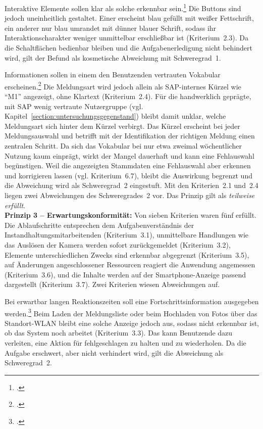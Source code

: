 Interaktive Elemente sollen klar als solche erkennbar
sein.\footcite[Vgl.][Abschnitt~5.2.2.4]{DIN_ISO_9241-110:2020}
Die Buttons sind jedoch uneinheitlich gestaltet.
Einer erscheint blau gefüllt mit weißer Fettschrift, ein anderer nur blau
umrandet mit dünner blauer Schrift, sodass ihr Interaktionscharakter weniger
unmittelbar erschließbar ist (Kriterium~2.3).
Da die Schaltflächen bedienbar bleiben und die Aufgabenerledigung nicht behindert
wird, gilt der Befund als kosmetische Abweichung mit Schweregrad~1.

Informationen sollen in einem den Benutzenden vertrauten Vokabular
erscheinen.\footcite[Vgl.][Abschnitt~5.2.2.5]{DIN_ISO_9241-110:2020}
Die Meldungsart wird jedoch allein als SAP-internes Kürzel wie \enquote{M1}
angezeigt, ohne Klartext (Kriterium~2.4).
Für die handwerklich geprägte, mit SAP wenig vertraute Nutzergruppe
(vgl. Kapitel~\ref{section:untersuchungsgegenstand}) bleibt damit unklar, welche
Meldungsart sich hinter dem Kürzel verbirgt.
Das Kürzel erscheint bei jeder Meldungsauswahl und betrifft mit der
Identifikation der richtigen Meldung einen zentralen Schritt.
Da sich das Vokabular bei nur etwa zweimal wöchentlicher Nutzung kaum einprägt,
wirkt der Mangel dauerhaft und kann eine Fehlauswahl begünstigen.
Weil die angezeigten Stammdaten eine Fehlauswahl aber erkennen und korrigieren
lassen (vgl. Kriterium~6.7), bleibt die Auswirkung begrenzt und die Abweichung
wird als Schweregrad~2 eingestuft.
Mit den Kriterien~2.1 und~2.4 liegen zwei Abweichungen des Schweregrades~2 vor.
Das Prinzip gilt als \emph{teilweise erfüllt}.\\
\textbf{Prinzip 3 -- Erwartungskonformität:}
Von sieben Kriterien waren fünf erfüllt.
Die Ablaufschritte entsprechen dem Aufgabenverständnis der
Instandhaltungsmitarbeitenden (Kriterium~3.1), unmittelbare Handlungen wie das
Auslösen der Kamera werden sofort zurückgemeldet (Kriterium~3.2), Elemente
unterschiedlichen Zwecks sind erkennbar abgegrenzt (Kriterium~3.5), auf
Änderungen angeschlossener Ressourcen reagiert die Anwendung angemessen
(Kriterium~3.6), und die Inhalte werden auf der Smartphone-Anzeige passend
dargestellt (Kriterium~3.7).
Zwei Kriterien wiesen Abweichungen auf.

Bei erwartbar langen Reaktionszeiten soll eine Fortschrittsinformation ausgegeben
werden.\footcite[Vgl.][Abschnitt~5.3.2.4]{DIN_ISO_9241-110:2020}
Beim Laden der Meldungsliste oder beim Hochladen von Fotos über das Standort-WLAN
bleibt eine solche Anzeige jedoch aus, sodass nicht erkennbar ist, ob das System
noch arbeitet (Kriterium~3.3).
Das kann Benutzende dazu verleiten, eine Aktion für fehlgeschlagen zu halten und
zu wiederholen.
Da die Aufgabe erschwert, aber nicht verhindert wird, gilt die Abweichung als
Schweregrad~2.

